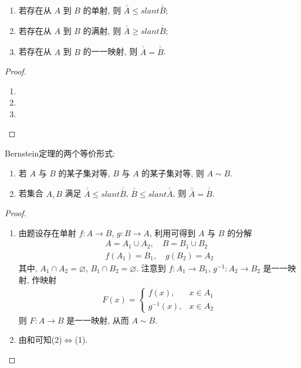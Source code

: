 \documentclass[../../main.tex]{subfiles}
\begin{document}
\begin{proposition}[映射与基数之间的关系]\label{proposition:映射与基数之间的关系}
\begin{enumerate}[(1)]
\item 若存在从 $A$ 到 $B$ 的单射, 则 $\overline{\overline{A}} \leqslant slant \overline{\overline{B}}$;
\item 若存在从 $A$ 到 $B$ 的满射, 则 $\overline{\overline{A}} \geqslant slant \overline{\overline{B}}$;
\item 若存在从 $A$ 到 $B$ 的一一映射, 则 $\overline{\overline{A}} = \overline{\overline{B}}$.
\end{enumerate}
\end{proposition}
\begin{proof}
\begin{enumerate}[(1)]
\item 

\item 

\item 
\end{enumerate}
\end{proof}

\begin{theorem}[Bernstein定理]\label{theorem:Bernstein定理}
Bernstein定理的两个等价形式:
\begin{enumerate}[(1)]
\item 若 $A$ 与 $B$ 的某子集对等, $B$ 与 $A$ 的某子集对等, 则 $A \sim B$.

\item 若集合 $A, B$ 满足 $\overline{\overline{A}} \leqslant slant \overline{\overline{B}}$, $\overline{\overline{B}} \leqslant slant \overline{\overline{A}}$, 则 $\overline{\overline{A}} = \overline{\overline{B}}$. 
\end{enumerate}
\end{theorem}
\begin{proof}
\begin{enumerate}[(1)]
\item 由题设存在单射 $f : A \to B$, $g : B \to A$, 利用可得到 $A$ 与 $B$ 的分解
\begin{align*}
A = A_1 \cup A_2, \quad B = B_1 \cup B_2\\
f(A_1) = B_1, \quad g(B_2) = A_2
\end{align*}
其中, $A_1 \cap A_2 = \varnothing$, $B_1 \cap B_2 = \varnothing$. 注意到 $f : A_1 \to B_1$, $g^{-1} : A_2 \to B_2$ 是一一映射, 作映射
\begin{align*}
F(x) = 
\begin{cases}
f(x), & x \in A_1\\
g^{-1}(x), & x \in A_2
\end{cases}
\end{align*}
则 $F : A \to B$ 是一一映射, 从而 $A \sim B$.

\item 由和可知(2)$\Leftrightarrow$(1).
\end{enumerate}
\end{proof}
\end{document}
